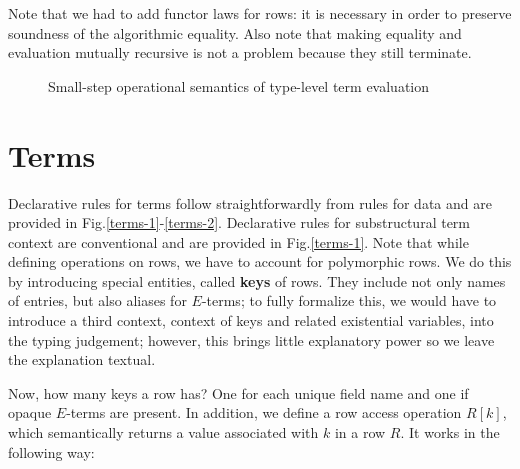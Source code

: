 \documentclass[a4paper,14pt]{extreport}
\begin{document}
Note that we had to add functor laws for rows: it is necessary in order to
preserve soundness of the algorithmic equality. Also note that making equality
and evaluation mutually recursive is not a problem because they still terminate.

\begin{figure}[h!]
    \centering
    \caption{Small-step operational semantics of type-level term evaluation}
    \label{eval}
\end{figure}

\section{Terms}

Declarative rules for terms follow straightforwardly from rules for data and are
provided in Fig.\ref{terms-1}-\ref{terms-2}. Declarative rules for substructural
term context are conventional and are provided in Fig.\ref{terms-1}. Note that
while defining operations on rows, we have to account for polymorphic rows. We
do this by introducing special entities, called \textbf{keys} of rows. They
include not only names of entries, but also aliases for $E$-terms; to fully
formalize this, we would have to introduce a third context, context of keys and
related existential variables, into the typing judgement; however, this brings
little explanatory power so we leave the explanation textual.

Now, how many keys a row has? One for each unique field name and one if opaque
$E$-terms are present. In addition, we define a row access operation $R[k]$,
which semantically returns a value associated with $k$ in a row $R$. It works in
the following way:
\end{document}

